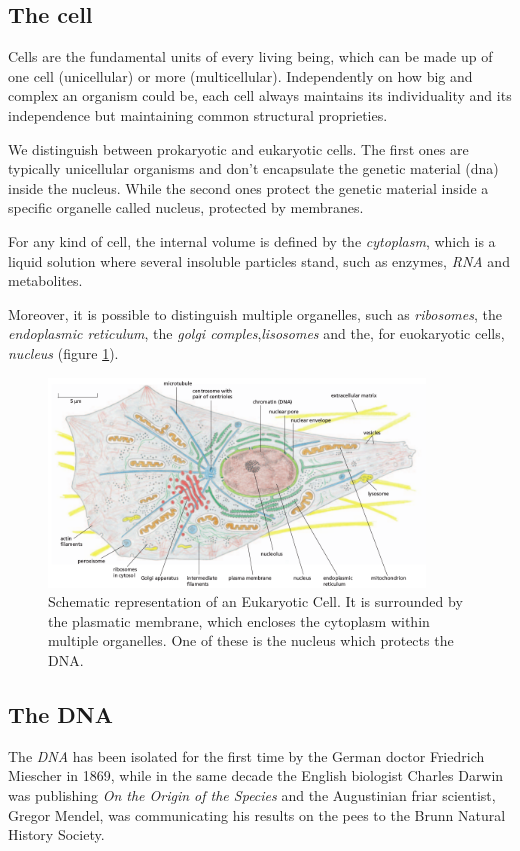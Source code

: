 \subsection{The cell}
\label{sec:cell}
Cells are the fundamental units of every living being, which can be made up of one cell (unicellular) or more (multicellular).
Independently on how big and complex an organism could be, each cell always maintains its individuality and its independence but maintaining common structural proprieties.

We distinguish between prokaryotic and eukaryotic cells. 
The first ones are typically unicellular organisms and don't encapsulate the genetic material (\gls{dna}) inside the nucleus.
While the second ones protect the genetic material inside a specific organelle called nucleus, protected by membranes.

For any kind of cell, the internal volume is defined by the \textit{cytoplasm}, which is a liquid solution where several insoluble particles stand, such as enzymes, \textit{RNA} and metabolites.

Moreover, it is possible to distinguish multiple organelles, such as \textit{ribosomes}, the \textit{endoplasmic reticulum}, the \textit{golgi comples},\textit{lisosomes} and the, for euokaryotic cells, \textit{nucleus} (figure \ref{fig:cell}).

\begin{figure}[h]
\centering
\includegraphics[width=10cm, keepaspectratio]{img/intro/cell.png}
\caption[The Cell]{Schematic representation of an Eukaryotic Cell. 
It is surrounded by the plasmatic membrane, which encloses the cytoplasm within multiple organelles. 
One of these is the nucleus which protects the DNA.}
\label{fig:cell}
\end{figure}

\subsection{The DNA}
\label{sec:genica}
The \textit{DNA} has been isolated for the first time by the German doctor Friedrich Miescher in 1869, while in the same decade the English biologist Charles Darwin was publishing \textit{On the Origin of the Species} and the  Augustinian friar scientist, Gregor Mendel, was communicating his results on the pees to the Brunn Natural History Society.

